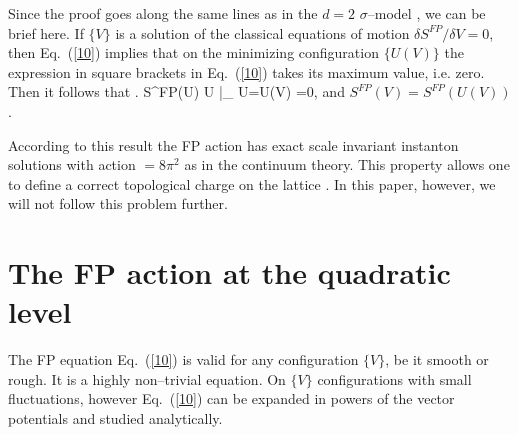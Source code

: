 Since the proof goes along the same lines as in the $d=2$
$\sigma$--model \cite{HN}, we can be brief here.
If $\{ V \}$ is a solution of the classical equations of motion
$\delta S^{FP}/\delta V =0$, then Eq.~(\ref{10}) implies that
on the minimizing configuration $\{ U(V)\}$ the expression
in square brackets in Eq.~(\ref{10}) takes its
maximum value, i.e. zero.
Then it follows that
\bee
\left. {\delta S^{FP}(U) \over \delta U } 
\right|_{ U=U(V) } =0,                                      \label{11}
\ee
and $S^{FP}(V)=S^{FP}(U(V))$.

According to this result the FP action has exact scale invariant 
instanton solutions with action $=8\pi^2$ as in the continuum 
theory. This property allows  one to define a correct topological 
charge on the lattice \cite{INSTANTON}. In this paper, however,
we will not follow this problem further.

\section{The FP action at the quadratic level}

The FP equation Eq.~(\ref{10}) is valid for any configuration 
$\{V\}$, be it smooth or rough. It is a highly non--trivial 
equation. On $\{V\}$ configurations with small fluctuations, however
Eq.~(\ref{10}) can be expanded in powers of the vector
potentials and studied analytically.

